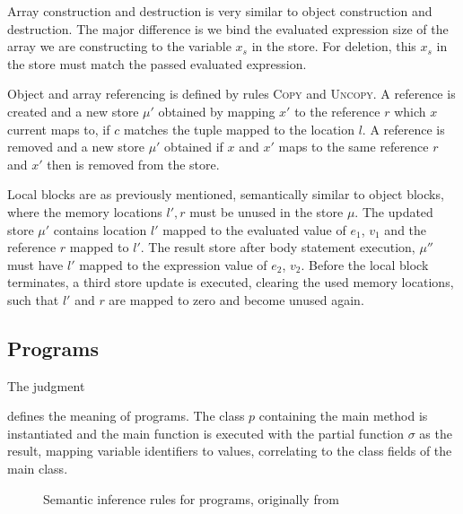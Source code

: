Array construction and destruction is very similar to object construction and destruction. The major difference is we bind the evaluated expression size of the array we are constructing to the variable $x_s$ in the store. For deletion, this $x_s$ in the store must match the passed evaluated expression.

Object and array referencing is defined by rules \textsc{Copy} and \textsc{Uncopy}. A reference is created and a new store $\mu'$ obtained by mapping $x'$ to the reference $r$ which $x$ current maps to, if $c$ matches the tuple mapped to the location $l$. A reference is removed and a new store $\mu'$ obtained if $x$ and $x'$ maps to the same reference $r$ and $x'$ then is removed from the store.

Local blocks are as previously mentioned, semantically similar to object blocks, where the memory locations $l', r$ must be unused in the store $\mu$. The updated store $\mu'$ contains location $l'$ mapped to the evaluated value of $e_1$, $v_1$ and the reference $r$ mapped to $l'$. The result store after body statement execution, $\mu''$ must have $l'$ mapped to the expression value of $e_2$, $v_2$. Before the local block terminates, a third store update is executed, clearing the used memory locations, such that $l'$ and $r$ are mapped to zero and become unused again.

\subsection{Programs}
\label{subsec:semantics-programs}
The judgment
\begin{prooftree}
\end{prooftree}
defines the meaning of programs. The class $p$ containing the main method is instantiated and the main function is executed with the partial function $\sigma$ as the result, mapping variable identifiers to values, correlating to the class fields of the main class.

\begin{figure}[ht]
    \begin{center}
        
        \DP
        \DP
        \DP
        \DP
        \DP
    \end{center}
    \caption{Semantic inference rules for programs, originally from~\cite{th:roopl}}
    \label{fig:semantics-programs}
\end{figure}

